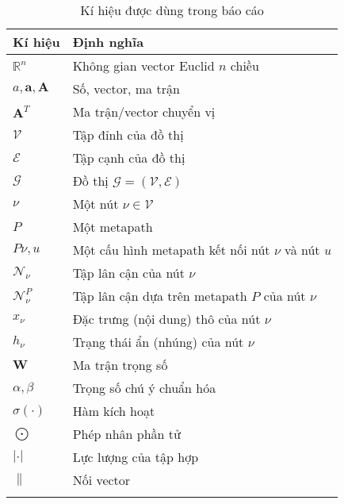 \begin{table}[]
  \label{tb:01}
  \caption[]{Kí hiệu được dùng trong báo cáo}
  \begin{tabular}{ll}
  \hline
  \multicolumn{1}{|l|}{Kí hiệu} & \multicolumn{1}{l|}{Định nghĩa} \\ \hline
  \multicolumn{1}{|l|}{$\mathbb{R}^n$} & \multicolumn{1}{l|}{Không gian vector Euclid $n$ chiều} \\ \hline
  \multicolumn{1}{|l|}{$a, \mathbf{a}, \mathbf{A}$} & \multicolumn{1}{l|}{Số, vector, ma trận}   \\ \hline
  \multicolumn{1}{|l|}{$\mathbf{A}^T$} & \multicolumn{1}{l|}{Ma trận/vector chuyển vị}   \\ \hline
  \multicolumn{1}{|l|}{$\pmb{\mathcal{V}}$} & \multicolumn{1}{l|}{Tập đỉnh của đồ thị}   \\ \hline
  \multicolumn{1}{|l|}{$\pmb{\mathcal{E}}$} & \multicolumn{1}{l|}{Tập cạnh của đồ thị}   \\ \hline
  \multicolumn{1}{|l|}{$\pmb{\mathcal{G}}$} & \multicolumn{1}{l|}{Đồ thị $\pmb{\mathcal{G} = (\pmb{\mathcal{V}}, \pmb{\mathcal{E}})}$}   \\ \hline
  \multicolumn{1}{|l|}{$\nu$} & \multicolumn{1}{l|}{Một nút $\nu \in \pmb{\mathcal{V}}$}   \\ \hline
  \multicolumn{1}{|l|}{$P$} & \multicolumn{1}{l|}{Một metapath}   \\ \hline
  \multicolumn{1}{|l|}{$P{\nu, u}$} & \multicolumn{1}{l|}{Một cấu hình metapath kết nối nút $\nu$ và nút $u$}   \\ \hline
  \multicolumn{1}{|l|}{$\pmb{\mathcal{N}}_{\nu}$} & \multicolumn{1}{l|}{Tập lân cận của nút $\nu$}   \\ \hline
  \multicolumn{1}{|l|}{$\pmb{\mathcal{N}}^P_{\nu}$} & \multicolumn{1}{l|}{Tập lân cận dựa trên metapath $P$ của nút $\nu$}   \\ \hline
  \multicolumn{1}{|l|}{$x_{\nu}$} & \multicolumn{1}{l|}{Đặc trưng (nội dung) thô của nút $\nu$}   \\ \hline
  \multicolumn{1}{|l|}{$h_{\nu}$} & \multicolumn{1}{l|}{Trạng thái ẩn (nhúng) của nút $\nu$}   \\ \hline
  \multicolumn{1}{|l|}{$\mathbf{W}$} & \multicolumn{1}{l|}{Ma trận trọng số}   \\ \hline
  \multicolumn{1}{|l|}{$\alpha, \beta$} & \multicolumn{1}{l|}{Trọng số chú ý chuẩn hóa}   \\ \hline
  \multicolumn{1}{|l|}{$\sigma (\cdot)$} & \multicolumn{1}{l|}{Hàm kích hoạt}   \\ \hline
  \multicolumn{1}{|l|}{$\bigodot$} & \multicolumn{1}{l|}{Phép nhân phần tử}   \\ \hline
  \multicolumn{1}{|l|}{$|\cdot|$} & \multicolumn{1}{l|}{Lực lượng của tập hợp}   \\ \hline
  \multicolumn{1}{|l|}{$\parallel$} & \multicolumn{1}{l|}{Nối vector}   \\ \hline
                                &                                
  \end{tabular}
  \end{table}
